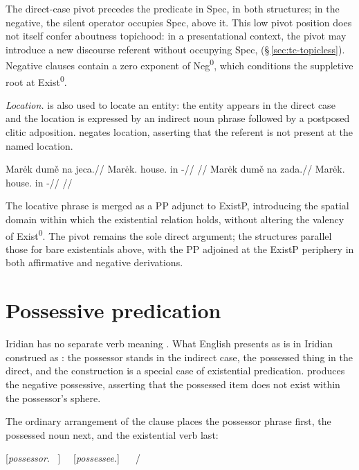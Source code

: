 \noindent The direct-case pivot precedes the predicate in
Spec, in both structures; in the negative, the silent operator
occupies Spec, above it. This low pivot position does not itself
confer aboutness topichood: in a
presentational context, the pivot may introduce a new discourse referent
without occupying Spec, (§\,\ref{sec:tc-topicless}).
Negative clauses contain a zero exponent
of Neg\textsuperscript{0}, which conditions the suppletive root 
at Exist\textsuperscript{0}.

\noindent\textit{Location.}\enspace {} is also used to locate an entity: the entity
appears in the direct case and the location is expressed by an indirect noun
phrase followed by a postposed clitic adposition.  negates location,
asserting that the referent is not present at the named location.

\pex
\a
\begingl
\gla Marėk dumě na jeca.//
\glb Marėk.\Dir{} house.\Ind{} in \Exst{}-\Cont{}//
\glft {}//
\endgl
\a
\begingl
\gla Marėk dumě na zada.//
\glb Marėk.\Dir{} house.\Ind{} in \NegExst{}-\Cont{}//
\glft {}//
\endgl
\xe

\noindent The locative phrase is merged as a PP adjunct to ExistP, introducing
the spatial domain within which the existential relation holds, without altering
the valency of Exist\textsuperscript{0}. The pivot remains the sole direct
argument; the structures parallel those for bare existentials above, with the PP
adjoined at the ExistP periphery in both affirmative and negative derivations.

\section{Possessive predication}\label{sec:existence-possession}

Iridian has no separate verb meaning . What English presents as
 is in Iridian construed as : the
possessor stands in the indirect case, the possessed thing in the direct, and
the construction is a special case of existential predication. 
produces the negative possessive, asserting that the possessed item does not
exist within the possessor's sphere.

The ordinary arrangement of the clause places the possessor phrase first, the
possessed noun next, and the existential verb last:

\begin{center}
[\emph{possessor}.\Ind{} \ ] \ \ [\emph{possessee}.\Dir{}] \ \  / 
\end{center}

